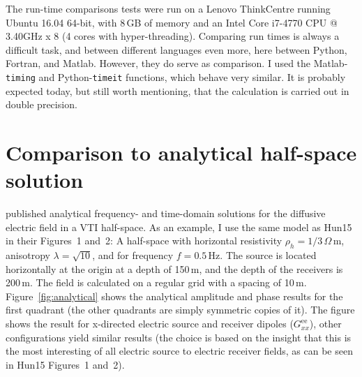\documentclass[manuscript]{geophysics}
\newcommand{\tnt}[1]{#1}
\newcommand{\fortran}{\tnt{Fortran}\xspace}
\newcommand{\python}{\tnt{Python}\xspace}
\newcommand{\matlab}{\tnt{Matlab}\xspace}
\begin{document}
The run-time comparisons tests were run on a Lenovo ThinkCentre running Ubuntu
16.04 64-bit, with 8\,GB of memory and an Intel Core i7-4770 CPU @ 3.40GHz x 8
(4 cores with hyper-threading). Comparing run times is always a difficult task,
and between different languages even more, here between \python, \fortran, and
\matlab. However, they do serve as comparison.  I used the
\matlab-\texttt{timing} and \python-\texttt{timeit} functions, which behave
very similar. It is probably expected today, but still worth mentioning, that
the calculation is carried out in double precision.

\section{Comparison to analytical half-space solution}

\cite{PIER.10.Slob} published analytical frequency- and time-domain solutions
for the diffusive electric field in a VTI half-space. As an example, I use the
same model as Hun15 in their Figures~1 and~2: A half-space with horizontal
resistivity $\rho_h = 1/3\,\Omega$\,m, anisotropy $\lambda = \sqrt{10}$, and
for frequency $f = 0.5\,$Hz. The source is located horizontally at the origin
at a depth of 150\,m, and the depth of the receivers is 200\,m. The field is
calculated on a regular grid with a spacing of 10\,m.
Figure~\ref{fig:analytical} shows the analytical amplitude and phase results
for the first quadrant (the other quadrants are simply symmetric copies of it).
%
%
The figure shows the result for x-directed electric source and receiver
dipoles ($G^\mathrm{ee}_{xx}$), other configurations yield similar results (the
choice is based on the insight that this is the most interesting of all
electric source to electric receiver fields, as can be seen in Hun15 Figures~1
and~2).
\end{document}
